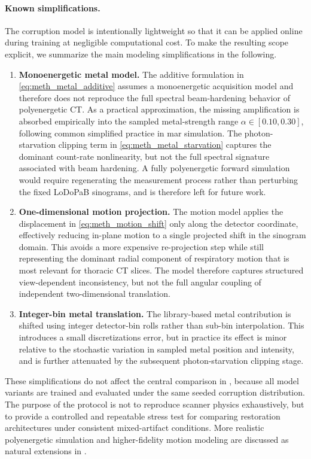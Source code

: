 \paragraph{Known simplifications.}
The corruption model is intentionally lightweight so that it can be applied online during training at negligible computational cost. To make the resulting scope explicit, we summarize the main modeling simplifications in the following.

\begin{enumerate}
    \item \textbf{Monoenergetic metal model.}
    The additive formulation in \eqref{eq:meth_metal_additive} assumes a monoenergetic acquisition model and therefore does not reproduce the full spectral beam-hardening behavior of polyenergetic CT. As a practical approximation, the missing amplification is absorbed empirically into the sampled metal-strength range $\alpha \in [0.10, 0.30]$, following common simplified practice in \gls{mar} simulation. The photon-starvation clipping term in \eqref{eq:meth_metal_starvation} captures the dominant count-rate nonlinearity, but not the full spectral signature associated with beam hardening. A fully polyenergetic forward simulation would require regenerating the measurement process rather than perturbing the fixed LoDoPaB sinograms, and is therefore left for future work.

    \item \textbf{One-dimensional motion projection.}
    The motion model applies the displacement in \eqref{eq:meth_motion_shift} only along the detector coordinate, effectively reducing in-plane motion to a single projected shift in the sinogram domain. This avoids a more expensive re-projection step while still representing the dominant radial component of respiratory motion that is most relevant for thoracic CT slices. The model therefore captures structured view-dependent inconsistency, but not the full angular coupling of independent two-dimensional translation.

    \item \textbf{Integer-bin metal translation.}
    The library-based metal contribution is shifted using integer detector-bin rolls rather than sub-bin interpolation. This introduces a small discretizations error, but in practice its effect is minor relative to the stochastic variation in sampled metal position and intensity, and is further attenuated by the subsequent photon-starvation clipping stage.
\end{enumerate}

These simplifications do not affect the central comparison in , because all model variants are trained and evaluated under the same seeded corruption distribution. The purpose of the protocol is not to reproduce scanner physics exhaustively, but to provide a controlled and repeatable stress test for comparing restoration architectures under consistent mixed-artifact conditions. More realistic polyenergetic simulation and higher-fidelity motion modeling are discussed as natural extensions in .
